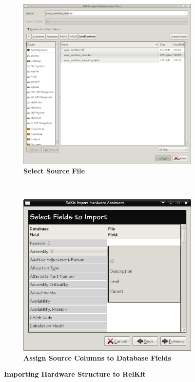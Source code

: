 \documentclass[11pt, 12pt, twoside, onecolumn]{book}
\begin{document}
\begin{figure}[htbp]
	\centering
	\begin{subfigure}[b]{0.6\textwidth}
		\centering
        \includegraphics[width=\textwidth]{./figures/new_project_import_bom_1}
        \caption{\textbf{Select Source File}}
        \label{fig:select_file}
	\end{subfigure}
	\\
   	\begin{subfigure}[b]{0.6\textwidth}
   		\centering
        \includegraphics[width=\textwidth]{./figures/new_project_import_bom_2}
        \caption{\textbf{Assign Source Columns to Database Fields}}
        \label{fig:match_columns}
	\end{subfigure}
	\caption{\textbf{Importing Hardware Structure to RelKit}}
	\label{fig:import_hardware}
\end{figure}
	
\end{document}
